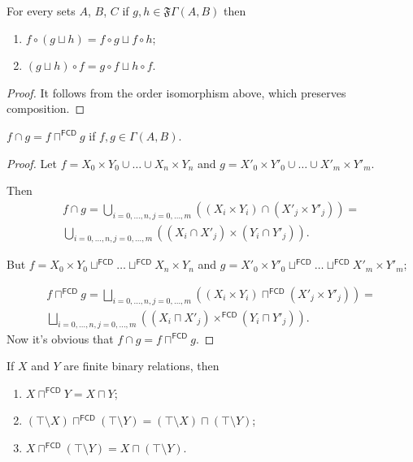 \begin{thm}
For every sets $A$, $B$, $C$ if $g,h\in\mathfrak{F}\Gamma(A,B)$
then
\begin{enumerate}
\item $f\circ(g\sqcup h)=f\circ g\sqcup f\circ h$;
\item $(g\sqcup h)\circ f=g\circ f\sqcup h\circ f$.
\end{enumerate}
\end{thm}
\begin{proof}
It follows from the order isomorphism above, which preserves composition.\end{proof}
\begin{thm}
$f\cap g=f\sqcap^{\mathsf{FCD}}g$ if $f,g\in\Gamma(A,B)$.\end{thm}
\begin{proof}
Let $f=X_{0}\times Y_{0}\cup\ldots\cup X_{n}\times Y_{n}$ and $g=X'_{0}\times Y'_{0}\cup\ldots\cup X'_{m}\times Y'_{m}$.

Then 
\begin{multline*}
f\cap g=\bigcup_{i=0,\ldots,n,j=0,\ldots,m}((X_{i}\times Y_{i})\cap(X'_{j}\times Y'_{j}))=\\
\bigcup_{i=0,\ldots,n,j=0,\ldots,m}((X_{i}\cap X'_{j})\times(Y_{i}\cap Y'_{j})).
\end{multline*}


But $f=X_{0}\times Y_{0}\sqcup^{\mathsf{FCD}}\ldots\sqcup^{\mathsf{FCD}}X_{n}\times Y_{n}$
and $g=X'_{0}\times Y'_{0}\sqcup^{\mathsf{FCD}}\ldots\sqcup^{\mathsf{FCD}}X'_{m}\times Y'_{m}$;

\begin{multline*}
f\sqcap^{\mathsf{FCD}}g=\bigsqcup_{i=0,\ldots,n,j=0,\ldots,m}((X_{i}\times Y_{i})\sqcap^{\mathsf{FCD}}(X'_{j}\times Y'_{j}))=\\
\bigsqcup_{i=0,\ldots,n,j=0,\ldots,m}((X_{i}\sqcap X'_{j})\times^{\mathsf{FCD}}(Y_{i}\sqcap Y'_{j})).
\end{multline*}
Now it's obvious that $f\cap g=f\sqcap^{\mathsf{FCD}}g$.\end{proof}

\begin{cor}
If $X$ and $Y$ are finite binary relations, then
\begin{enumerate}
  \item $X \sqcap^{\mathsf{FCD}} Y = X \sqcap Y$;
  \item $(\top \setminus X) \sqcap^{\mathsf{FCD}} (\top \setminus Y) =
  (\top \setminus X) \sqcap (\top \setminus Y)$;
  \item $X \sqcap^{\mathsf{FCD}} (\top \setminus Y) = X \sqcap (\top
  \setminus Y)$.
\end{enumerate}
\end{cor}

